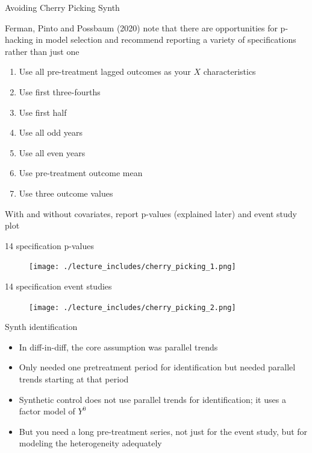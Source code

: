 \documentclass{beamer}
\begin{document}
\begin{frame}{Avoiding Cherry Picking Synth}

Ferman, Pinto and Possbaum (2020) note that there are opportunities for p-hacking in model selection and recommend reporting a variety of specifications rather than just one

\begin{enumerate}
\item Use all pre-treatment lagged outcomes as your $X$ characteristics
\item Use first three-fourths
\item Use first half
\item Use all odd years
\item Use all even years
\item Use pre-treatment outcome mean
\item Use three outcome values
\end{enumerate}

\bigskip

With and without covariates, report p-values (explained later) and event study plot

\end{frame}

\begin{frame}{14 specification p-values}

	\begin{figure}
	\texttt{[image: ./lecture\_includes/cherry\_picking\_1.png]}
	\end{figure}

\end{frame}

\begin{frame}{14 specification event studies}

	\begin{figure}
	\texttt{[image: ./lecture\_includes/cherry\_picking\_2.png]}
	\end{figure}

\end{frame}


\begin{frame}{Synth identification}

\begin{itemize}
\item In diff-in-diff, the core assumption was parallel trends
\item Only needed one pretreatment period for identification but needed parallel trends starting at that period
\item Synthetic control does not use parallel trends for identification; it uses a factor model of $Y^0$
\item But you need a long pre-treatment series, not just for the event study, but for modeling the heterogeneity adequately
\end{itemize}

\end{frame}
\end{document}
